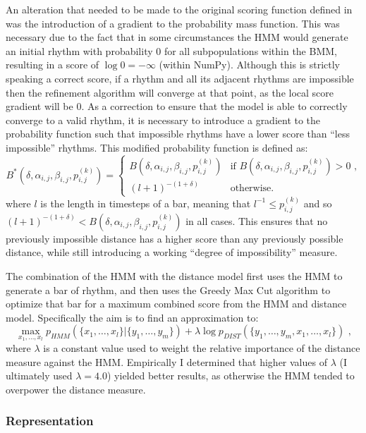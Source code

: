 \documentclass[ author={Stephen Livermore-Tozer},
				supervisor={Dr. Peter Flach},
				degree={MEng},
				title={Algorithmic Co-composition Using Machine Learning},
				subtitle={},
				type={research},
				year={2016} ]{dissertation}
\begin{document}
	An alteration that needed to be made to the original scoring function defined in \cite{paiement2007generative} was the introduction of a gradient to the probability mass function. This was necessary due to the fact that in some circumstances the HMM would generate an initial rhythm with probability $0$ for all subpopulations within the BMM, resulting in a score of $\log 0 = -\infty$ (within NumPy). Although this is strictly speaking a correct score, if a rhythm and all its adjacent rhythms are impossible then the refinement algorithm will converge at that point, as the local score gradient will be $0$. As a correction to ensure that the model is able to correctly converge to a valid rhythm, it is necessary to introduce a gradient to the probability function such that impossible rhythms have a lower score than ``less impossible'' rhythms. This modified probability function is defined as:
	$$B^*(\delta,\alpha_{i,j},\beta_{i,j},p_{i,j}^{(k)}) =
	\begin{cases}
		B(\delta,\alpha_{i,j},\beta_{i,j},p_{i,j}^{(k)}) & \text{if } B(\delta,\alpha_{i,j},\beta_{i,j},p_{i,j}^{(k)}) > 0 \text{ ,} \\
		(l+1)^{-(1 + \delta)} & \text{otherwise.}
	\end{cases}$$
	where $l$ is the length in timesteps of a bar, meaning that $l^{-1} \leq p_{i,j}^{(k)}$ and so $(l+1)^{-(1 + \delta)} < B(\delta,\alpha_{i,j},\beta_{i,j},p_{i,j}^{(k)})$ in all cases. This ensures that no previously impossible distance has a higher score than any previously possible distance, while still introducing a working ``degree of impossibility'' measure. 
	
	The combination of the HMM with the distance model first uses the HMM to generate a bar of rhythm, and then uses the Greedy Max Cut algorithm \cite{rohde2002methods} to optimize that bar for a maximum combined score from the HMM and distance model. Specifically the aim is to find an approximation to:
	$$ \max_{x_1,\dots,x_l} p_{HMM}(\{x_1,\dots,x_l\} | \{y_1,\dots,y_m\}) + \lambda \log p_{DIST}(\{y_1,\dots,y_m,x_1,\dots,x_l\}) \text{ ,} $$
	where $\lambda$ is a constant value used to weight the relative importance of the distance measure against the HMM. Empirically I determined that higher values of $\lambda$ (I ultimately used $\lambda = 4.0$) yielded better results, as otherwise the HMM tended to overpower the distance measure.
	
	\subsubsection{Representation}
	
\end{document}
